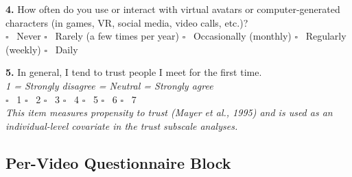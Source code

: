 \documentclass[11pt, a4paper]{article}
\begin{document}
\vspace{8pt}
\noindent\textbf{4.} How often do you use or interact with virtual avatars or computer-generated characters (in games, VR, social media, video calls, etc.)?\\[4pt]
$\square$ \ Never \quad $\square$ \ Rarely (a few times per year) \quad $\square$ \ Occasionally (monthly) \quad $\square$ \ Regularly (weekly) \quad $\square$ \ Daily

\vspace{8pt}
\noindent\textbf{5.} In general, I tend to trust people I meet for the first time.\\[4pt]
\noindent\small\textit{1 = Strongly disagree  = Neutral  = Strongly agree}\\[4pt]
$\square$ \ 1 \quad $\square$ \ 2 \quad $\square$ \ 3 \quad $\square$ \ 4 \quad $\square$ \ 5 \quad $\square$ \ 6 \quad $\square$ \ 7\\[2pt]
\noindent\small\textit{This item measures propensity to trust (Mayer et al., 1995) and is used as an individual-level covariate in the trust subscale analyses.}

\newpage

\subsection{Per-Video Questionnaire Block}
\label{sec:perblock}
\end{document}
